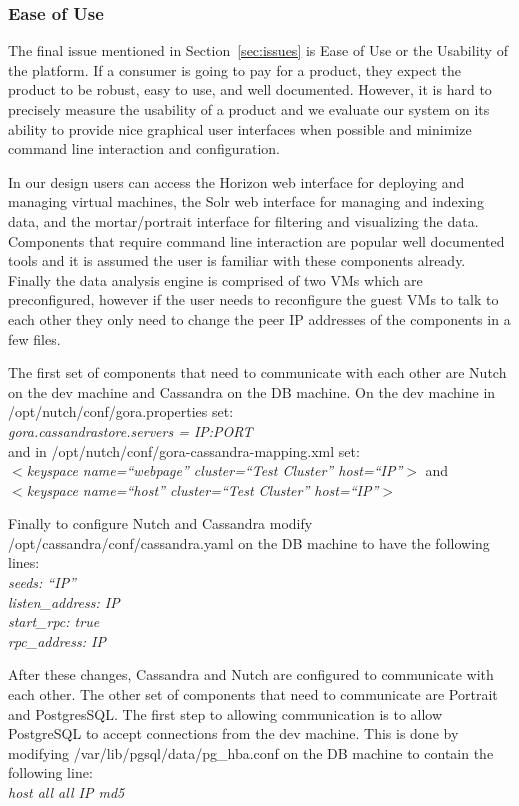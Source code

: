 \subsubsection{Ease of Use}
\label{sec:ease}
The final issue mentioned in Section~\ref{sec:issues} is Ease of Use or
the Usability of the platform. If a consumer is going to pay for a
product, they expect the product to be robust, easy to use, and well
documented. However, it is hard to precisely measure the usability of a
product and we evaluate our system on its ability to provide nice
graphical user interfaces when possible and minimize command line
interaction and configuration.

In our design users can access the Horizon web interface for deploying
and managing virtual machines, the Solr web interface for managing and
indexing data, and the mortar/portrait interface for filtering and
visualizing the data. Components that require command line interaction
are popular well documented tools and it is assumed the user is
familiar with these components already. Finally the data analysis engine
is comprised of two VMs which are preconfigured, however if the user
needs to reconfigure the guest VMs to talk to each other they only need
to change the peer IP addresses of the components in a few files.

The first set of components that need to communicate with each other are
Nutch on the dev machine and Cassandra on the DB machine. On the dev
machine in /opt/nutch/conf/gora.properties set:\\
\textit{gora.cassandrastore.servers = IP:PORT}\\
and in /opt/nutch/conf/gora-cassandra-mapping.xml set:\\
\textit{$<$keyspace name=``webpage'' cluster=``Test Cluster''
host=``IP''$>$} and\\
\textit{$<$keyspace name=``host'' cluster=``Test Cluster''
host=``IP''$>$}

Finally to configure Nutch and Cassandra modify 
/opt/cassandra/conf/cassandra.yaml on the DB machine to have the
following lines:\\
\textit{seeds: ``IP''\\listen\_address: IP\\start\_rpc:
true\\rpc\_address: IP}

After these changes, Cassandra and Nutch are configured to communicate
with each other. The other set of components that need to communicate
are Portrait and PostgresSQL. The first step to allowing communication
is to allow PostgreSQL to accept connections from the dev machine. This
is done by modifying /var/lib/pgsql/data/pg\_hba.conf on the DB machine
to contain the following line:\\
\textit{host all all IP md5}

